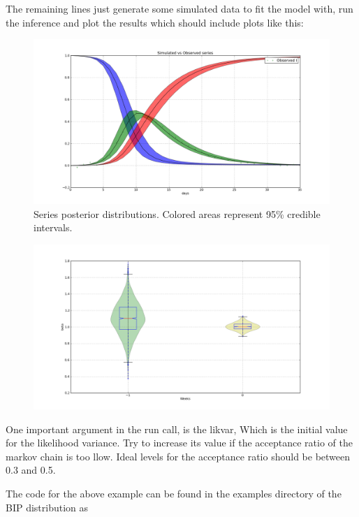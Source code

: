 \documentclass[a4paper,10pt,english]{sphinxmanual}
\begin{document}
The remaining lines just generate some simulated data to fit the model with, run the inference and plot the results which should include plots like this:
\begin{figure}[htbp]
\centering
\capstart

\includegraphics[width=15cm]{fit_series.png}
\caption{Series posterior distributions. Colored areas represent 95\% credible intervals.}\end{figure}
\begin{figure}[htbp]
\centering

\includegraphics[width=15cm]{fit_par.png}
\end{figure}

One important argument in the run call, is the likvar, Which is the initial value for the likelihood variance. Try to increase its value if the acceptance ratio of the markov chain is too llow. Ideal levels for the acceptance ratio should be between 0.3 and 0.5.

The code for the above example can be found in the examples directory of the BIP distribution as 
\end{document}
